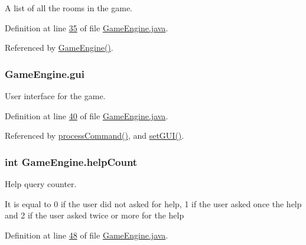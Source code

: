 A list of all the rooms in the game. 



Definition at line \hyperlink{GameEngine_8java_source_l00035}{35} of file \hyperlink{GameEngine_8java_source}{Game\-Engine.\-java}.



Referenced by \hyperlink{GameEngine_8java_source_l00059}{Game\-Engine()}.

\hypertarget{classGameEngine_a2a7d0bb6183b3f3ef3ee2008926374a0}{
\subsubsection[{gui}]{ Game\-Engine.\-gui\hspace{0.3cm}{\ttfamily [private]}}}\label{classGameEngine_a2a7d0bb6183b3f3ef3ee2008926374a0}


User interface for the game. 



Definition at line \hyperlink{GameEngine_8java_source_l00040}{40} of file \hyperlink{GameEngine_8java_source}{Game\-Engine.\-java}.



Referenced by \hyperlink{GameEngine_8java_source_l00179}{process\-Command()}, and \hyperlink{GameEngine_8java_source_l00071}{set\-G\-U\-I()}.

\hypertarget{classGameEngine_a308a9926d553d53cb4c56c28588f6c62}{
\subsubsection[{help\-Count}]{\setlength{\rightskip}{0pt plus 5cm}int Game\-Engine.\-help\-Count\hspace{0.3cm}{\ttfamily [private]}}}\label{classGameEngine_a308a9926d553d53cb4c56c28588f6c62}


Help query counter. 

It is equal to 0 if the user did not asked for help, 1 if the user asked once the help and 2 if the user asked twice or more for the help 

Definition at line \hyperlink{GameEngine_8java_source_l00048}{48} of file \hyperlink{GameEngine_8java_source}{Game\-Engine.\-java}.



